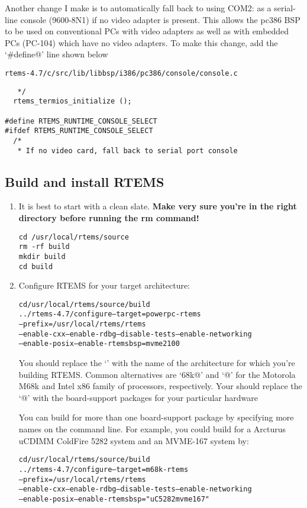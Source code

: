 \documentclass{report}
\newcommand{\rtemsVersion}{4.7}
\begin{document}
Another change I make is to automatically fall back to using COM2: as a
serial-line console (9600-8N1) if no video adapter is present.  This allows
the pc386 BSP to be used on conventional PCs with video adapters as well
as with embedded PCs (PC-104) which have no video adapters.
To make this change, add the `\verb@#define@' line shown below
\begin{alltt}
rtems-\rtemsVersion/c/src/lib/libbsp/i386/pc386/console/console.c
\end{alltt}
\begin{verbatim}
   */
  rtems_termios_initialize ();

#define RTEMS_RUNTIME_CONSOLE_SELECT
#ifdef RTEMS_RUNTIME_CONSOLE_SELECT
  /*
   * If no video card, fall back to serial port console
\end{verbatim}

\subsection{Build and install RTEMS}
\label{RTEMS_BSP_CONFIG}
\begin{enumerate}
\item
It is best to start with a clean slate.  {\bf Make very sure you're in the
right directory before running the rm command!}
\begin{verbatim}
cd /usr/local/rtems/source
rm -rf build
mkdir build
cd build
\end{verbatim}

\item
Configure RTEMS for your target architecture:
\begin{alltt}
cd /usr/local/rtems/source/build
../rtems-\rtemsVersion/configure --target=powerpc-rtems\rtemsToolVersion \verb@\@
   --prefix=/usr/local/rtems/rtems\rtemsToolVersion \verb@\@
  --enable-cxx --enable-rdbg --disable-tests --enable-networking \verb@\@
  --enable-posix --enable-rtemsbsp=mvme2100 \verb@\@
\end{alltt}
You should replace the `\verb@powerpc@' with the name of the architecture
for which you're building RTEMS.  Common alternatives
are `\verb@m68k@' and `@' for
the Motorola M68k and Intel x86 family of processors, respectively.
Your should replace the `@' with the board-support packages
for your particular hardware

You can build for more than one board-support package by specifying
more names on the command line.  For example,
you could build for a Arcturus uCDIMM ColdFire 5282 system and an MVME-167 system
by:
\begin{alltt}
cd /usr/local/rtems/source/build
../rtems-\rtemsVersion/configure --target=m68k-rtems\rtemsToolVersion \verb@\@
      --prefix=/usr/local/rtems/rtems\rtemsToolVersion \verb@\@
      --enable-cxx --enable-rdbg --disable-tests --enable-networking \verb@\@
      --enable-posix --enable-rtemsbsp="uC5282 mvme167" \verb@\@
\end{alltt}

\end{enumerate}
\end{document}

